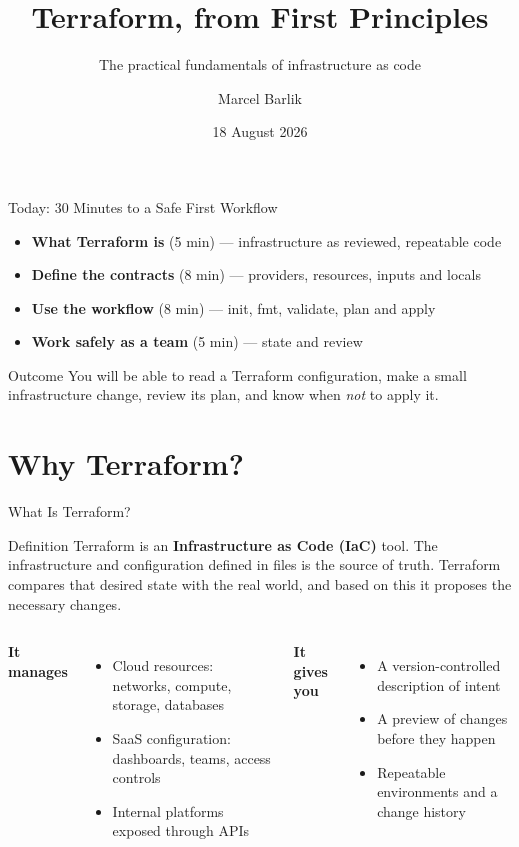 \documentclass[aspectratio=169, xcolor=table]{beamer}
\title{Terraform, from First Principles}
\subtitle{The practical fundamentals of infrastructure as code}
\author{Marcel Barlik}
\date{18 August 2026}
\begin{document}
\begin{frame}[plain]
  \titlepage
\end{frame}

\begin{frame}{Today: 30 Minutes to a Safe First Workflow}
  \begin{itemize}
    \item \textbf{What Terraform is} (5 min) --- infrastructure as reviewed, repeatable code
    \item \textbf{Define the contracts} (8 min) --- providers, resources, inputs and locals
    \item \textbf{Use the workflow} (8 min) --- init, fmt, validate, plan and apply
    \item \textbf{Work safely as a team} (5 min) --- state and review
  \end{itemize}

  \vspace{1em}
  \begin{alertblock}{Outcome}
    You will be able to read a Terraform configuration, make a small infrastructure change,
    review its plan, and know when \emph{not} to apply it.
  \end{alertblock}
\end{frame}

\section{Why Terraform?}

\begin{frame}{What Is Terraform?}
  \begin{block}{Definition}
    Terraform is an \textbf{Infrastructure as Code (IaC)} tool. The infrastructure and
    configuration defined in files is the source of truth. Terraform compares that desired
    state with the real world, and based on this it proposes the necessary changes.
  \end{block}

  \vspace{0.7em}
  \begin{columns}[T]
    \textbf{It manages}
    \begin{itemize}
      \item Cloud resources: networks, compute, storage, databases
      \item SaaS configuration: dashboards, teams, access controls
      \item Internal platforms exposed through APIs
    \end{itemize}

    \textbf{It gives you}
    \begin{itemize}
      \item A version-controlled description of intent
      \item A preview of changes before they happen
      \item Repeatable environments and a change history
    \end{itemize}
  \end{columns}
\end{frame}
\end{document}

